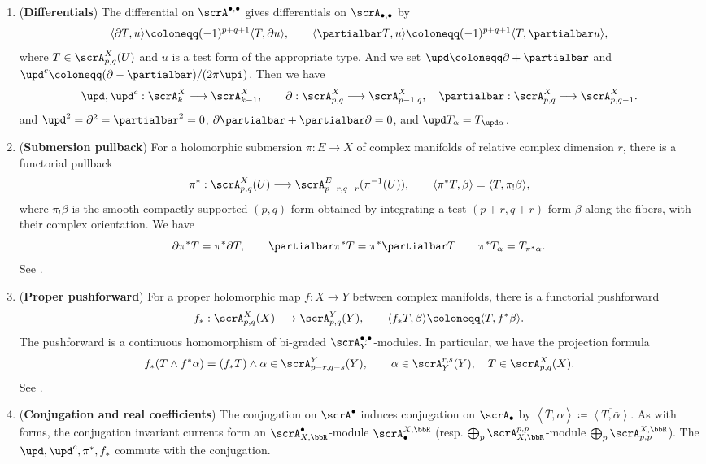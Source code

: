 \begin{proposition}[label=\labelNFM{prop:basic-properties-of-currents}, status=draft, tag=0000000]
\begin{enumerate}
		\item (\textbf{Differentials}) The differential on $\scrA^{\bullet,\bullet}$ gives differentials on $\scrA_{\bullet,\bullet}$ by
		      \[
			      \langle\partial T,u\rangle \coloneqq (-1)^{p+q+1}\langle T,\partial u\rangle,
			      \qquad
			      \langle\partialbar T,u\rangle \coloneqq (-1)^{p+q+1}\langle T,\partialbar u\rangle,
		      \]
		      where $T \in \scrA_{p,q}^X(U)$ and $u$ is a test form of the appropriate type.
		      And we set $\upd \coloneqq \partial + \partialbar$ and $\upd^c \coloneqq (\partial-\partialbar)/(2\pi \upi)$.
		      Then we have
		      \[
			      \upd, \upd^c:\scrA_k^X \longrightarrow \scrA^X_{k-1},
			      \qquad
			      \partial : \scrA^X_{p,q} \longrightarrow \scrA^X_{p-1,q},\quad
			      \partialbar : \scrA^X_{p,q} \longrightarrow \scrA^X_{p,q-1}.
		      \]
		      and
		      $\upd^2 = \partial^2 = \partialbar^2 = 0$,
		      $\partial\partialbar+\partialbar\partial = 0$, and
		      $\upd T_\alpha = T_{\upd\alpha}$.
		\item (\textbf{Submersion pullback}) For a holomorphic submersion $\pi:E \to X$ of complex manifolds of relative complex dimension $r$, there is a functorial pullback
		      \[
			      \pi^*:\scrA_{p,q}^X(U) \longrightarrow \scrA_{p+r,q+r}^E(\pi^{-1}(U)),
			      \qquad \langle \pi^*T,\beta\rangle = \langle T,\pi_!\beta\rangle,
		      \]
		      where $\pi_!\beta$ is the smooth compactly supported $(p,q)$-form obtained by integrating a test $(p+r,q+r)$-form $\beta$ along the fibers, with their complex orientation.
		      We have
		      \[ \partial\pi^*T = \pi^*\partial T,\qquad \partialbar\pi^*T = \pi^*\partialbar T \qquad \pi^*T_{\alpha} = T_{\pi^*\alpha}. \]
		      See \cite[Proposition 3.2.5]{Dinh-Sibony-2005-IntroductionTheoryCurrents}.
		\item (\textbf{Proper pushforward}) For a proper holomorphic map $f: X \to Y$ between complex manifolds, there is a functorial pushforward
		      \[
			      f_*:\scrA_{p,q}^X(X) \longrightarrow \scrA_{p,q}^Y(Y),\qquad \langle f_*T,\beta\rangle \coloneqq \langle T,f^*\beta\rangle.
		      \]
		      The pushforward is a continuous homomorphism of bi-graded $\scrA_Y^{\bullet,\bullet}$-modules.
		      In particular, we have the projection formula
		      \[
			      f_*(T \wedge f^*\alpha) = (f_* T) \wedge \alpha \in \scrA_{p-r,q-s}^Y(Y),\qquad  \alpha \in \scrA_Y^{r,s}(Y),\quad T \in \scrA_{p,q}^X(X).
		      \]
		      See \cite[Exercise 3.2.12]{Dinh-Sibony-2005-IntroductionTheoryCurrents}.
		\item (\textbf{Conjugation and real coefficients}) The conjugation on $\scrA^{\bullet}$ induces conjugation on $\scrA_{\bullet}$ by $\left< \bar{T}, \alpha \right> \coloneqq \overline{\left< T, \bar{\alpha} \right>}$.
		      As with forms, the conjugation invariant currents form an $\scrA_{X,\bbR}^{\bullet}$-module $\scrA^{X,\bbR}_{\bullet}$ (resp. $\bigoplus_p \scrA_{X,\bbR}^{p,p}$-module $\bigoplus_p \scrA^{X,\bbR}_{p,p}$).
		      The $\upd,\upd^c,\pi^*,f_*$ commute with the conjugation.
	\end{enumerate}
\end{proposition}

